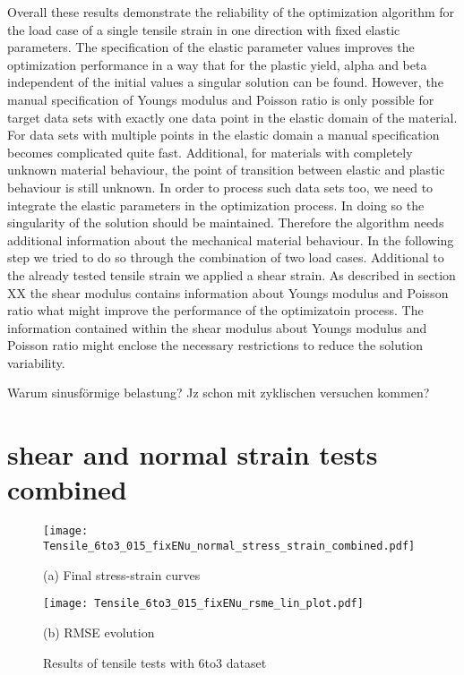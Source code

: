 Overall these results demonstrate the reliability of the optimization algorithm for the load case of a single tensile strain in one direction with fixed elastic parameters. The specification of the elastic parameter values improves the optimization performance in a way that for the plastic yield, alpha and beta independent of the initial values a singular solution can be found. However, the manual specification of Youngs modulus and Poisson ratio is only possible for target data sets with exactly one data point in the elastic domain of the material. For data sets with multiple points in the elastic domain a manual specification becomes complicated quite fast. Additional, for materials with completely unknown material behaviour, the point of transition between elastic and plastic behaviour is still unknown. In order to process such data sets too, we need to integrate the elastic parameters in the optimization process. In doing so the singularity of the solution should be maintained. Therefore the algorithm needs additional information about the mechanical material behaviour. In the following step we tried to do so through the combination of two load cases. Additional to the already tested tensile strain we applied a shear strain. As described in section XX the shear modulus contains information about Youngs modulus and  Poisson ratio what might improve the performance of the optimizatoin process. The information contained within the shear modulus about Youngs modulus and Poisson ratio might enclose the necessary restrictions to reduce the solution variability. 

Warum sinusförmige belastung? Jz schon mit zyklischen versuchen kommen?


\section{shear and normal strain tests combined}

\begin{figure}[H]
    \centering
    \begin{minipage}[t]{0.495\textwidth}
        \centering
        \texttt{[image: Tensile\_6to3\_015\_fixENu\_normal\_stress\_strain\_combined.pdf]}
        \caption*{(a) Final stress-strain curves}
        \label{fig:tensileStressStrain6to3}
    \end{minipage}
    \hfill
    \begin{minipage}[t]{0.495\textwidth}
        \centering
        \texttt{[image: Tensile\_6to3\_015\_fixENu\_rsme\_lin\_plot.pdf]}
        \caption*{(b) RMSE evolution}
        \label{subfigure:tensileRMSE}
    \end{minipage}
    \caption{Results of tensile tests with 6to3 dataset}
    \label{fig:tensileResults6to3}
\end{figure}

